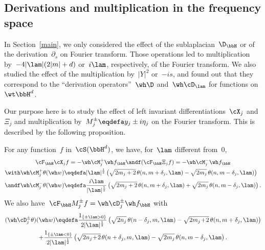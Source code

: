 \subsection{Derivations and multiplication in the frequency space}\label{derivationsmultiplication}

In Section~\ref{main}, we only considered the effect of the sublaplacian~$\D_\bbH$ or of the derivation~$\partial_s$ on Fourier transform. Those operations led to multiplication by~$-4|\lam| (2|m|+d)$ or~$i\lam$, respectively, of the Fourier transform. We also studied the effect of the multiplication by~$|Y|^2$ or~$-is$, and found out that they correspond to the ``derivation operators''~$\wh \D$ and~$\wh \cD_\lam$ for functions on $\wt\bbH^d$.

Our purpose here is to study the effect of left invariant differentiations~$\cX_j$ and $\Xi_j$ and multiplication by~$M_j^{\pm}\eqdefa y_j\pm i \eta_j$ on the Fourier transform. This is described by the following proposition.

\begin{prop}\label{actionX_jonFH}
For any function~$f$ in~$\cS(\bbH^{d})$, we have, for~$\lam$ different from~$0$,
\begin{gather*}
\cF_\bbH \cX_j f = -\wh \cM^+_j \wh f_\bbH \andf (\cF_\bbH \Xi_j f) = -\wh \cM^-_j \wh f_\bbH\\
\begin{aligned}
\with \wh \cM^+_j \theta (\wh w) & \eqdefa  |\lam|^{\frac 12 } \left(\sqrt {2m_j+2} \,\theta(n,m+\delta_j,\lam) -\sqrt {2m_j} \,\theta(n,m-\delta_j,\lam)\right)\\ \andf
\wh \cM^-_j \theta (\wh w) &\eqdefa  \frac { i \lam }{ |\lam|^{\frac 12 }} \left(\sqrt {2m_j+2}\, \theta(n,m+\delta_j,\lam) +\sqrt {2m_j} \,\theta(n,m-\delta_j,\lam)\right).
\end{aligned}
\end{gather*}
We also have~$\cF_\bbH M_j^\pm f = \wh \cD_j^\pm \wh f_\bbH$ with
\begin{multline*}
(\wh \cD_j^\pm \theta)(\wh w)\eqdefa \frac {1_{\{\pm\lam>0\}} }{2|\lam|^{\frac 12} } \left(\sqrt {2n_j}\, \theta (n-\delta_j,m,\lam)-\sqrt {2m_j\!+\!2}\, \theta(n,m+\delta_j,\lam)\right)\\
+ \frac {1_{\{\pm\lam<0\}} } {2|\lam|^{\frac 12}} \left(\sqrt {2n_j\!+\!2}\, \theta(n+\delta_j,m,\lam) -\sqrt {2m_j}\, \theta(n,m-\delta_j,\lam\right).
\end{multline*}
\end{prop}

